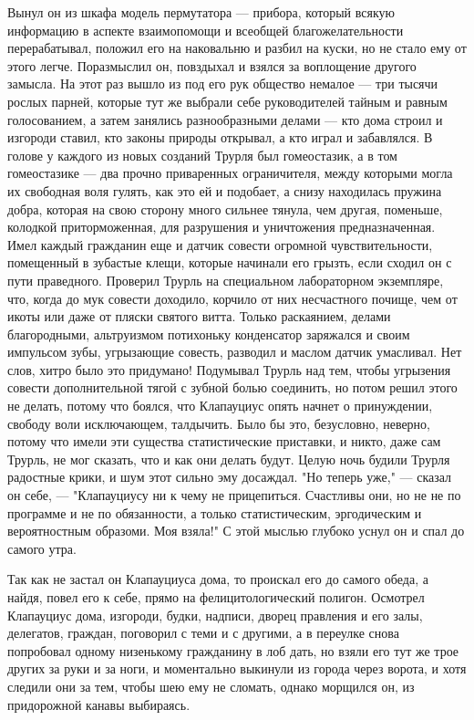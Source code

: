 Вынул он из шкафа модель пермутатора --- прибора, который
всякую информацию в аспекте взаимопомощи и всеобщей
благожелательности перерабатывал, положил его на наковальню
и разбил на куски, но не стало ему от этого легче.
Поразмыслил он, повздыхал и взялся за воплощение другого
замысла. На этот раз вышло из под его рук общество немалое --- три
тысячи рослых парней, которые тут же выбрали себе
руководителей тайным и равным голосованием, а затем занялись
разнообразными делами --- кто дома строил и изгороди ставил,
кто законы природы открывал, а кто играл и забавлялся. В
голове у каждого из новых созданий Трурля был гомеостазик, а
в том гомеостазике --- два прочно приваренных ограничителя,
между которыми могла их свободная воля гулять, как это ей и
подобает, а снизу находилась пружина добра, которая на свою
сторону много сильнее тянула, чем другая, поменьше, колодкой
приторможенная, для разрушения и уничтожения
предназначенная. Имел каждый гражданин еще и датчик совести
огромной чувствительности, помещенный в зубастые клещи,
которые начинали его грызть, если сходил он с пути
праведного. Проверил Трурль на специальном лабораторном
экземпляре, что, когда до мук совести доходило, корчило от
них несчастного почище, чем от икоты или даже от пляски
святого витта. Только раскаянием, делами благородными,
альтруизмом потихоньку конденсатор заряжался и своим
импульсом зубы, угрызающие совесть, разводил и маслом датчик
умасливал. Нет слов, хитро было это придумано! Подумывал
Трурль над тем, чтобы угрызения совести дополнительной тягой
с зубной болью соединить, но потом решил этого не делать,
потому что боялся, что Клапауциус опять начнет о
принуждении, свободу воли исключающем, талдычить. Было бы
это, безусловно, неверно, потому что имели эти существа
статистические приставки, и никто, даже сам Трурль, не мог
сказать, что и как они делать будут. Целую ночь будили
Трурля радостные крики, и шум этот сильно эму досаждал. "Но
теперь уже," --- сказал он себе, --- "Клапауциусу ни к чему не
прицепиться. Счастливы они, но не не по программе и не по
обязанности, а только статистическим, эргодическим и
вероятностным образоми. Моя взяла!" С этой мыслью глубоко
уснул он и спал до самого утра.

Так как не застал он Клапауциуса дома, то проискал его до
самого обеда, а найдя, повел его к себе, прямо на
фелицитологический полигон. Осмотрел Клапауциус дома,
изгороди, будки, надписи, дворец правления и его залы,
делегатов, граждан, поговорил с теми и с другими, а в
переулке снова попробовал одному низенькому гражданину в лоб
дать, но взяли его тут же трое других за руки и за ноги, и
моментально выкинули из города через ворота, и хотя следили
они за тем, чтобы шею ему не сломать, однако морщился он, из
придорожной канавы выбираясь.

